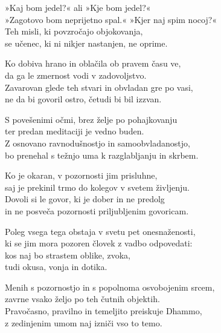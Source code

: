 »Kaj bom jedel?« ali »Kje bom jedel?«\\
»Zagotovo bom neprijetno spal.« »Kjer naj spim nocoj?«\\
Teh misli, ki povzročajo objokovanja,\\
se učenec, ki ni nikjer nastanjen, ne oprime.

Ko dobiva hrano in oblačila ob pravem času ve,\\
da ga le zmernost vodi v zadovoljstvo.\\
Zavarovan glede teh stvari in obvladan gre po vasi,\\
ne da bi govoril ostro, četudi bi bil izzvan.

S povešenimi očmi, brez želje po pohajkovanju\\
ter predan meditaciji je vedno buden.\\
Z osnovano ravnodušnostjo in samoobvladanostjo,\\
bo prenehal s težnjo uma k razglabljanju in skrbem.

Ko je okaran, v pozornosti jim prisluhne,\\
saj je prekinil trmo do kolegov v svetem življenju.\\
Dovoli si le govor, ki je dober in ne predolg\\
in ne posveča pozornosti priljubljenim govoricam.

Poleg vsega tega obstaja v svetu pet onesnaženosti,\\
ki se jim mora pozoren človek z vadbo odpovedati:\\
kos naj bo strastem oblike, zvoka,\\
tudi okusa, vonja in dotika.

Menih s pozornostjo in s popolnoma osvobojenim srcem,\\
zavrne vsako željo po teh čutnih objektih.\\
Pravočasno, pravilno in temeljito preiskuje Dhammo,\\
z zedinjenim umom naj izniči vso to temo.

